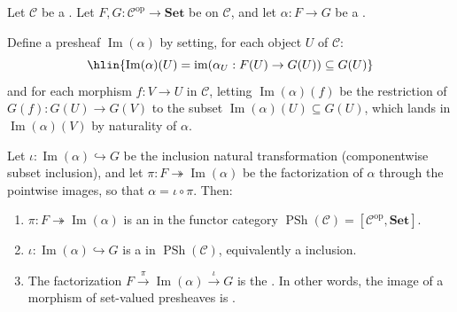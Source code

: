 \begin{proposition} \label{proposition:images_of_morphisms_in_set_valued_presheaves_on_a_category_are_computed_pointwise}
    Let $\mathcal{C}$ be a . Let $F, G: \mathcal{C}^{\operatorname{op}} \to \mathbf{Set}$ be  on $\mathcal{C}$, and let $\alpha: F \to G$ be a .

    Define a presheaf $\operatorname{Im}(\alpha)$ by setting, for each object $U$ of $\mathcal{C}$:
    $$\hlin{\operatorname{Im}(\alpha)(U) = \operatorname{im}(\alpha_U: F(U) \to G(U)) \subseteq G(U)}$$
    and for each morphism $f: V \to U$ in $\mathcal{C}$, letting $\operatorname{Im}(\alpha)(f)$ be the restriction of $G(f): G(U) \to G(V)$ to the subset $\operatorname{Im}(\alpha)(U) \subseteq G(U)$, which lands in $\operatorname{Im}(\alpha)(V)$ by naturality of $\alpha$.

    Let $\iota: \operatorname{Im}(\alpha) \hookrightarrow G$ be the inclusion natural transformation (componentwise subset inclusion), and let $\pi: F \twoheadrightarrow \operatorname{Im}(\alpha)$ be the factorization of $\alpha$ through the pointwise images, so that $\alpha = \iota \circ \pi$. Then:
    \begin{enumerate}
        \item $\pi: F \twoheadrightarrow \operatorname{Im}(\alpha)$ is an  in the functor category $\operatorname{PSh}(\mathcal{C}) = [\mathcal{C}^{\operatorname{op}}, \mathbf{Set}]$.
        \item $\iota: \operatorname{Im}(\alpha) \hookrightarrow G$ is a  in $\operatorname{PSh}(\mathcal{C})$, equivalently a  inclusion.
        \item The factorization $F \xrightarrow{\pi} \operatorname{Im}(\alpha) \xrightarrow{\iota} G$ is the . In other words, the image of a morphism of set-valued presheaves is .
    \end{enumerate}
\end{proposition}
